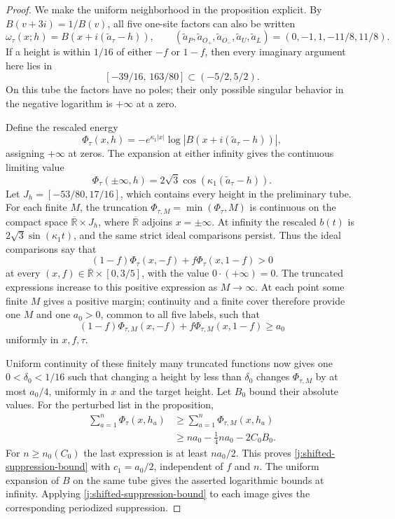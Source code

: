 \begin{proof}
We make the uniform neighborhood in the proposition explicit. By \(B(v+3i)=1/B(v)\), all five one-site factors can also be written
\[
\omega_\tau(x;h)=B(x+i(\widetilde a_\tau-h)),
\qquad
(\widetilde a_P,\widetilde a_{O_+},\widetilde a_{O_-},
\widetilde a_U,\widetilde a_L)=(0,-1,1,-11/8,11/8).
\]
If a height is within \(1/16\) of either \(-f\) or \(1-f\), then every imaginary argument here lies in
\[
[-39/16,\,163/80]\subset(-5/2,5/2).
\]
On this tube the factors have no poles; their only possible singular behavior in the negative logarithm is \(+\infty\) at a zero.

Define the rescaled energy
\[
\Phi_\tau(x,h)
=-e^{\kappa_1|x|}\log|B(x+i(\widetilde a_\tau-h))|,
\]
assigning \(+\infty\) at zeros. The expansion at either infinity gives the continuous limiting value
\[
\Phi_\tau(\pm\infty,h)=2\sqrt3\cos(\kappa_1(\widetilde a_\tau-h)).
\]
Let \(J_h=[-53/80,17/16]\), which contains every height in the preliminary tube. For each finite \(M\), the truncation \(\Phi_{\tau,M}=\min(\Phi_\tau,M)\) is continuous on the compact space \(\overline{\mathbb R}\times J_h\), where \(\overline{\mathbb R}\) adjoins \(x=\pm\infty\). At infinity the rescaled \(b(t)\) is \(2\sqrt3\sin(\kappa_1t)\), and the same strict ideal comparisons persist. Thus the ideal comparisons say that
\[
(1-f)\Phi_\tau(x,-f)+f\Phi_\tau(x,1-f)>0
\]
at every \((x,f)\in\overline{\mathbb R}\times[0,3/5]\), with the value \(0\cdot(+\infty)=0\). The truncated expressions increase to this positive expression as \(M\to\infty\). At each point some finite \(M\) gives a positive margin; continuity and a finite cover therefore provide one \(M\) and one \(a_0>0\), common to all five labels, such that
\[
(1-f)\Phi_{\tau,M}(x,-f)+f\Phi_{\tau,M}(x,1-f)\ge a_0
\]
uniformly in \(x,f,\tau\).

Uniform continuity of these finitely many truncated functions now gives one \(0<\delta_0<1/16\) such that changing a height by less than \(\delta_0\) changes \(\Phi_{\tau,M}\) by at most \(a_0/4\), uniformly in \(x\) and the target height. Let \(B_0\) bound their absolute values. For the perturbed list in the proposition,
\[
\begin{aligned}
\sum_{a=1}^n\Phi_\tau(x,h_a)
&\ge\sum_{a=1}^n\Phi_{\tau,M}(x,h_a)\\
&\ge n a_0-\tfrac14na_0-2C_0B_0.
\end{aligned}
\]
For \(n\ge n_0(C_0)\) the last expression is at least \(na_0/2\). This proves \eqref{j:shifted-suppression-bound} with \(c_1=a_0/2\), independent of \(f\) and \(n\). The uniform expansion of \(B\) on the same tube gives the asserted logarithmic bounds at infinity. Applying \eqref{j:shifted-suppression-bound} to each image gives the corresponding periodized suppression.
\end{proof}
